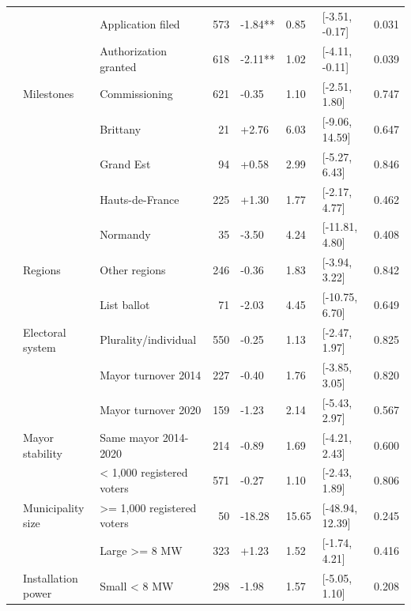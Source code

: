 \begin{ThreePartTable}
\begin{longtable}[t]{lllrllll}
\cmidrule{2-8}\nopagebreak
 &  & Application filed & 573 & -1.84** & 0.85 & {}[-3.51, -0.17] & 0.031\\
\cmidrule{3-8}\nopagebreak
 &  & Authorization granted & 618 & -2.11** & 1.02 & {}[-4.11, -0.11] & 0.039\\
\cmidrule{3-8}\nopagebreak
 & \multirow[t]{-3}{*}{\raggedright\arraybackslash Milestones} & Commissioning & 621 & -0.35 & 1.10 & {}[-2.51, 1.80] & 0.747\\
\cmidrule{2-8}\nopagebreak
 &  & Brittany & 21 & +2.76 & 6.03 & {}[-9.06, 14.59] & 0.647\\
\cmidrule{3-8}\nopagebreak
 &  & Grand Est & 94 & +0.58 & 2.99 & {}[-5.27, 6.43] & 0.846\\
\cmidrule{3-8}\nopagebreak
 &  & Hauts-de-France & 225 & +1.30 & 1.77 & {}[-2.17, 4.77] & 0.462\\
\cmidrule{3-8}\nopagebreak
 &  & Normandy & 35 & -3.50 & 4.24 & {}[-11.81, 4.80] & 0.408\\
\cmidrule{3-8}\nopagebreak
 & \multirow[t]{-5}{*}{\raggedright\arraybackslash Regions} & Other regions & 246 & -0.36 & 1.83 & {}[-3.94, 3.22] & 0.842\\
\cmidrule{2-8}\nopagebreak
 &  & List ballot & 71 & -2.03 & 4.45 & {}[-10.75, 6.70] & 0.649\\
\cmidrule{3-8}\nopagebreak
 & \multirow[t]{-2}{*}{\raggedright\arraybackslash Electoral system} & Plurality/individual & 550 & -0.25 & 1.13 & {}[-2.47, 1.97] & 0.825\\
\cmidrule{2-8}\nopagebreak
 &  & Mayor turnover 2014 & 227 & -0.40 & 1.76 & {}[-3.85, 3.05] & 0.820\\
\cmidrule{3-8}\nopagebreak
 &  & Mayor turnover 2020 & 159 & -1.23 & 2.14 & {}[-5.43, 2.97] & 0.567\\
\cmidrule{3-8}\nopagebreak
 & \multirow[t]{-3}{*}{\raggedright\arraybackslash Mayor stability} & Same mayor 2014-2020 & 214 & -0.89 & 1.69 & {}[-4.21, 2.43] & 0.600\\
\cmidrule{2-8}\nopagebreak
 &  & < 1,000 registered voters & 571 & -0.27 & 1.10 & {}[-2.43, 1.89] & 0.806\\
\cmidrule{3-8}\nopagebreak
 & \multirow[t]{-2}{*}{\raggedright\arraybackslash Municipality size} & >= 1,000 registered voters & 50 & -18.28 & 15.65 & {}[-48.94, 12.39] & 0.245\\
\cmidrule{2-8}\nopagebreak
 &  & Large >= 8 MW & 323 & +1.23 & 1.52 & {}[-1.74, 4.21] & 0.416\\
\cmidrule{3-8}\nopagebreak
 & \multirow[t]{-2}{*}{\raggedright\arraybackslash Installation power} & Small < 8 MW & 298 & -1.98 & 1.57 & {}[-5.05, 1.10] & 0.208\\

\end{longtable}
\end{ThreePartTable}
